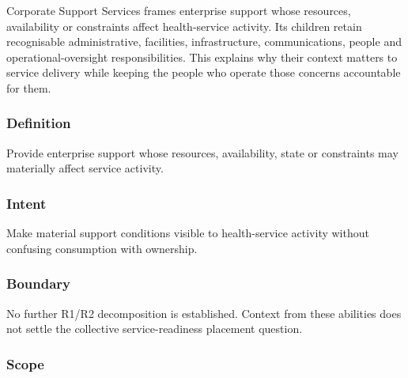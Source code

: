 Corporate Support Services frames enterprise support whose resources, availability or constraints affect health-service activity. Its children retain recognisable administrative, facilities, infrastructure, communications, people and operational-oversight responsibilities. This explains why their context matters to service delivery while keeping the people who operate those concerns accountable for them.

\subsubsection*{Definition}

Provide enterprise support whose resources, availability, state or constraints may materially affect service activity.

\subsubsection*{Intent}

Make material support conditions visible to health-service activity without confusing consumption with ownership.

\subsubsection*{Boundary}

No further R1/\allowbreak{}R2 decomposition is established. Context from these abilities does not settle the collective service-readiness placement question.

\subsubsection*{Scope}
